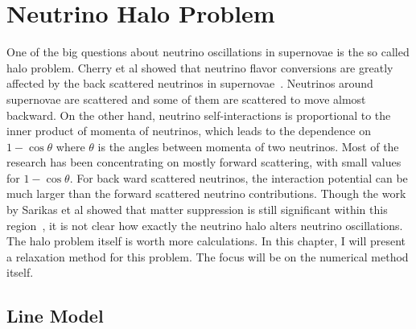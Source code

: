 




\section{\label{chap:halo}Neutrino Halo Problem}


One of the big questions about neutrino oscillations in supernovae is the so called halo problem. Cherry et al showed that neutrino flavor conversions are greatly affected by the back scattered neutrinos in supernovae~\cite{Cherry2012}. Neutrinos around supernovae are scattered and some of them are scattered to move almost backward. On the other hand, neutrino self-interactions is proportional to the inner product of momenta of neutrinos, which leads to the dependence on $1-\cos\theta$ where $\theta$ is the angles between momenta of two neutrinos. Most of the research has been concentrating on mostly forward scattering, with small values for $1-\cos\theta$. For back ward scattered neutrinos, the interaction potential can be much larger than the forward scattered neutrino contributions. Though the work by Sarikas et al showed that matter suppression is still significant within this region~\cite{Sarikas2012a}, it is not clear how exactly the neutrino halo alters neutrino oscillations. The halo problem itself is worth more calculations. In this chapter, I will present a relaxation method for this problem. The focus will be on the numerical method itself.


\subsection{\label{chap:halo-sec:line}Line Model}

